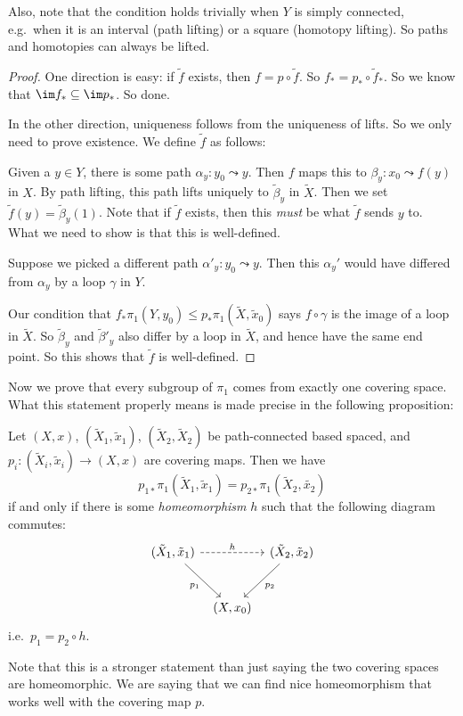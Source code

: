 \documentclass[a4paper]{article}
\begin{document}
Also, note that the condition holds trivially when $Y$ is simply connected, e.g.\ when it is an interval (path lifting) or a square (homotopy lifting). So paths and homotopies can always be lifted.

\begin{proof}
  One direction is easy: if $\tilde{f}$ exists, then $f = p \circ \tilde{f}$. So $f_* = p_* \circ \tilde{f}_*$. So we know that $\im f_* \subseteq \im p_*$. So done.

  In the other direction, uniqueness follows from the uniqueness of lifts. So we only need to prove existence. We define $\tilde{f}$ as follows:

  Given a $y \in Y$, there is some path $\alpha_y: y_0 \leadsto y$. Then $f$ maps this to $\beta_y: x_0 \leadsto f(y)$ in $X$. By path lifting, this path lifts uniquely to $\tilde{\beta}_y$ in $\tilde{X}$. Then we set $\tilde{f}(y) = \tilde{\beta}_y(1)$. Note that if $\tilde{f}$ exists, then this \emph{must} be what $\tilde{f}$ sends $y$ to. What we need to show is that this is well-defined.

  Suppose we picked a different path $\alpha'_y: y_0 \leadsto y$. Then this $\alpha_y'$ would have differed from $\alpha_y$ by a loop $\gamma$ in $Y$.

  Our condition that $f_* \pi_1(Y, y_0) \leq p_*\pi_1(\tilde{X}, \tilde{x}_0)$ says $f\circ \gamma$ is the image of a loop in $\tilde{X}$. So $\tilde{\beta}_y$ and $\tilde{\beta}'_y$ also differ by a loop in $\tilde{X}$, and hence have the same end point. So this shows that $\tilde{f}$ is well-defined.
\end{proof}

Now we prove that every subgroup of $\pi_1$ comes from exactly one covering space. What this statement properly means is made precise in the following proposition:
\begin{prop}
  Let $(X, x)$, $(\tilde{X}_1, \tilde{x}_1)$, $(\tilde{X}_2, \tilde{X}_2)$ be path-connected based spaced, and $p_i: (\tilde{X}_i, \tilde{x}_i) \to (X, x)$ are covering maps. Then we have
  \[
    p_{1*}\pi_1(\tilde{X}_1, \tilde{x}_1) = p_{2*} \pi_1(\tilde{X}_2, \tilde{x_2})
  \]
  if and only if there is some \emph{homeomorphism} $h$ such that the following diagram commutes:
  \[
    \begin{tikzcd}[row sep=large, column sep=tiny]
      (\tilde{X}_1, \tilde{x}_1) \ar[rr, dashed, "h"] \ar[rd, "p_1"'] & & (\tilde{X}_2, \tilde{x}_2) \ar[ld, "p_2"]\\
      & (X, x_0)
    \end{tikzcd}
  \]
  i.e.\ $p_1 = p_2 \circ h$.
\end{prop}
Note that this is a stronger statement than just saying the two covering spaces are homeomorphic. We are saying that we can find nice homeomorphism that works well with the covering map $p$.
\end{document}
